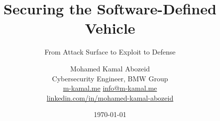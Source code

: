 \documentclass[aspectratio=169,11pt]{beamer}
\title{Securing the Software-Defined Vehicle}
\subtitle{From Attack Surface to Exploit to Defense}
\author{Mohamed Kamal Abozeid \\[2pt] {\small Cybersecurity Engineer, BMW Group} \\[2pt] {\small \url{m-kamal.me} \;\textbullet\; \href{mailto:info@m-kamal.me}{info@m-kamal.me}} \\[2pt] {\small \href{https://www.linkedin.com/in/mohamed-kamal-abozeid-814985b4/}{linkedin.com/in/mohamed-kamal-abozeid}}}
\institute{Munich}
\date{\today}
\begin{document}
\begin{frame}[plain]
  \titlepage
\end{frame}










\end{document}
